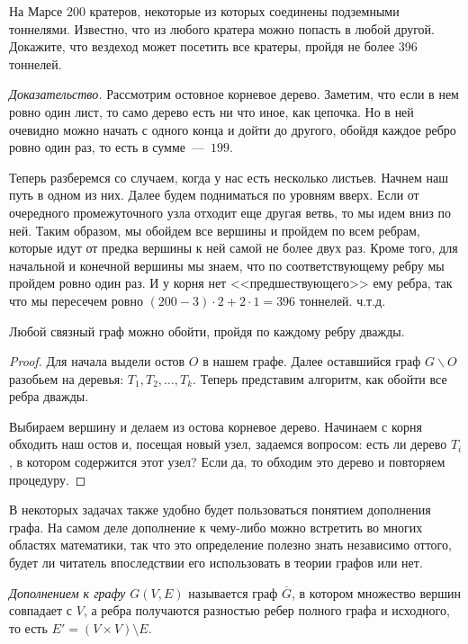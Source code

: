 \begin{example}
	На Марсе 200 кратеров, некоторые из которых соединены подземными тоннелями. Известно, что из любого кратера можно попасть в любой другой. Докажите, что вездеход может посетить все кратеры, пройдя не более 396 тоннелей.
	
	\emph{Доказательство.} Рассмотрим остовное корневое дерево. Заметим, что если в нем ровно один лист, то само дерево есть ни что иное, как цепочка. Но в ней очевидно можно начать с одного конца и дойти до другого, обойдя каждое ребро ровно один раз, то есть в сумме~---~$199$.
	
	Теперь разберемся со случаем, когда у нас есть несколько листьев. Начнем наш путь в одном из них. Далее будем подниматься по уровням вверх. Если от очередного промежуточного узла отходит еще другая ветвь, то мы идем вниз по ней. Таким образом, мы обойдем все вершины и пройдем по всем ребрам, которые идут от предка вершины к ней самой не более двух раз. Кроме того, для начальной и конечной вершины мы знаем, что по соответствующему ребру мы пройдем ровно один раз. И у корня нет <<предшествующего>> ему ребра, так что мы пересечем ровно $(200 - 3) \cdot 2 + 2 \cdot 1 = 396$ тоннелей. ч.т.д.
\end{example}

\begin{statement}
	Любой связный граф можно обойти, пройдя по каждому ребру дважды.
	
\begin{proof}
	Для начала выдели остов $O$ в нашем графе. Далее оставшийся граф $G \backslash O$ разобьем на деревья: $T_1, T_2, \dots, T_k$. Теперь представим алгоритм, как обойти все ребра дважды.
	
	Выбираем вершину и делаем из остова корневое дерево. Начинаем с корня обходить наш остов и, посещая новый узел, задаемся вопросом: есть ли дерево $T_i$, в котором содержится этот узел? Если да, то обходим это дерево и повторяем процедуру.
\end{proof}
\end{statement}


 В некоторых задачах также удобно будет пользоваться понятием дополнения графа. На самом деле дополнение к чему-либо можно встретить во многих областях математики, так что это определение полезно знать независимо оттого, будет ли читатель впоследствии его использовать в теории графов или нет.
	 
\begin{definition}
	\emph{Дополнением к графу $G\left(V, E\right)$} называется граф $\overline{G}$, в котором множество вершин совпадает с $V$, а ребра получаются разностью ребер полного графа и исходного, то есть $E' = (V \times V )\setminus E$.
\end{definition}

